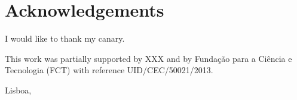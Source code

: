 \newpage

\chapter*{Acknowledgements}
\thispagestyle{empty}

I would like to thank my canary.

This work was partially supported by XXX and by Funda\c{c}\~{a}o para a Ci\^{e}ncia e Tecnologia (FCT) with reference UID/CEC/50021/2013.

\vfill
\begin{flushright}
  \begin{minipage}{8cm}
    \begin{center}
      Lisboa, \date

      \avitima
    \end{center}
  \end{minipage}
\end{flushright}

\cleardoublepage


\chapter*{}
\thispagestyle{empty}

